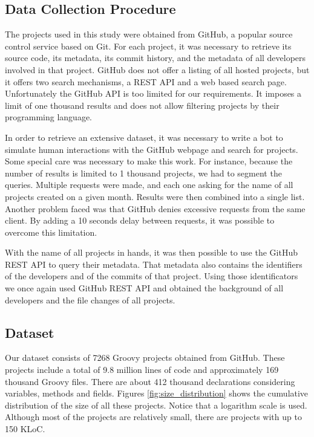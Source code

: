 \documentclass[preprint]{sigplanconf}
\begin{document}
\subsection{Data Collection Procedure\label{dataCollection}}
The projects used in this study were obtained from GitHub, a popular source control service based on Git.
For each project, it was necessary to retrieve its source code, its metadata, its commit history, and the metadata of all developers involved in that project.
GitHub does not offer a listing of all hosted projects, but it offers two search mechanisms, a REST API and a web based search page.
Unfortunately the GitHub API is too limited for our requirements.
It imposes a limit of one thousand results and does not allow filtering projects by their programming language.

In order to retrieve an extensive dataset, it was necessary to write a bot to simulate human interactions with the GitHub webpage and search for projects. 
Some special care was necessary to make this work. 
For instance, because the number of results is limited to 1 thousand projects, we had to segment the queries.
Multiple requests were made, and each one asking for the name of all projects created on a given month.
Results were then combined into a single list.
Another problem faced was that GitHub denies excessive requests from the same client.
By adding a 10 seconds delay between requests, it was possible to overcome this limitation.

With the name of all projects in hands, it was then possible to use the GitHub REST API to query their metadata.
That metadata also contains the identifiers of the developers and of the commits of that project.
Using those identificators we once again used GitHub REST API and obtained the background of all developers and the file changes of all projects.


\subsection{Dataset\label{dataset}}


Our dataset consists of 7268 Groovy projects obtained from GitHub. 
These projects include a total of 9.8 million lines of code and approximately 169 thousand Groovy files. 
There are about 412 thousand declarations considering variables, methods and fields. 
Figures \ref{fig:size_distribution} shows the cumulative distribution of the size of all these projects.
Notice that a logarithm scale is used.
Although most of the projects are relatively small, there are projects with up to 150 KLoC. 
\end{document}
